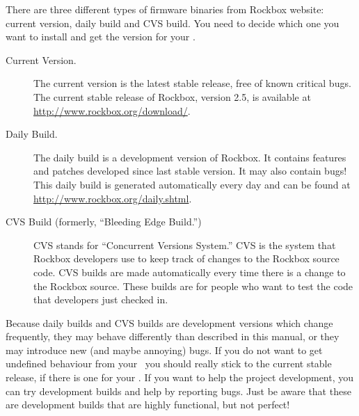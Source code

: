 There are three different types of firmware binaries from Rockbox website: 
current version, daily build and CVS build. You need to decide which one 	you 
want to install and get the version for your \dap{}.

\begin{description}

	\item[Current Version.] The current version is the latest stable release, free 
	of known critical bugs.  The current stable release of Rockbox, version 2.5, 
	is available at \url{http://www.rockbox.org/download/}. 		
  
		\item[Daily Build.] The daily build is a development version of Rockbox. It
		contains features and patches developed since last stable version.  It 
		may also contain bugs! This daily build is generated automatically every day 
		and can be found at \url{http://www.rockbox.org/daily.shtml}. 
  
		\item[CVS Build (formerly, ``Bleeding Edge Build.'')] CVS stands for 
		``Concurrent Versions System.'' CVS is the system that Rockbox 
		developers use to keep track of changes to the Rockbox source code. CVS 
		builds are made automatically every time there is a change to the 
		Rockbox source. These builds are for people who want to	test the code 
		that developers just checked in. 
		
\end{description}
	

Because daily builds and CVS builds are development versions which change 
frequently, they may behave differently than described in this manual, or 
they may introduce new (and maybe annoying) bugs. If you do not want to get 
undefined behaviour from your \dap\ you should really stick to the current 
stable release, if there is one for your \dap{}. If you want to help the 
project development, you can try development builds and help by reporting 
bugs. Just be aware that these are development builds that are 	highly 
functional, but not perfect!

